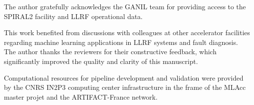 
The author gratefully acknowledges the GANIL team for providing access to the SPIRAL2 facility and LLRF operational data.

This work benefited from discussions with colleagues at other accelerator facilities regarding machine learning applications in LLRF systems and fault diagnosis. The author thanks the reviewers for their constructive feedback, which significantly improved the quality and clarity of this manuscript.

Computational resources for pipeline development and validation were provided by the CNRS IN2P3 computing center infrastructure in the frame of the MLAcc master projet and the ARTIFACT-France network.

